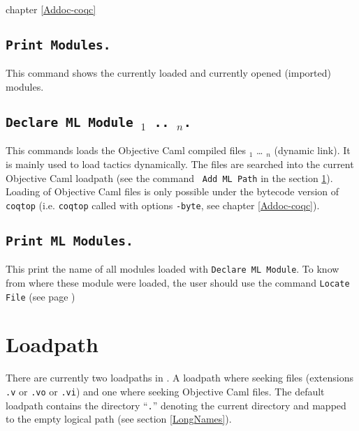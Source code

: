 \SeeAlso chapter \ref{Addoc-coqc}

\subsection{\tt Print Modules.}
This command shows the currently loaded and currently opened
(imported) modules.

\subsection{\tt Declare ML Module {\str$_1$} .. {\str$_n$}.}
This commands loads the Objective Caml compiled files {\str$_1$} \dots
{\str$_n$} (dynamic link). It is mainly used to load tactics
dynamically.
 The files are
searched into the current Objective Caml loadpath (see the command {\tt
Add ML Path} in the section \ref{loadpath}).  Loading of Objective Caml
files is only possible under the bytecode version of {\tt coqtop}
(i.e. {\tt coqtop} called with options {\tt -byte}, see chapter 
\ref{Addoc-coqc}).

\begin{ErrMsgs}
\item {}
\item {}
\end{ErrMsgs}

\subsection{\tt Print ML Modules.}
This print the name of all \ocaml{} modules loaded with \texttt{Declare
  ML Module}. To know from where these module were loaded, the user
should use the command \texttt{Locate File} (see page \pageref{Locate File})

\section{Loadpath}
\label{loadpath}

There are currently two loadpaths in \Coq. A loadpath where seeking
{\Coq} files (extensions {\tt .v} or {\tt .vo} or {\tt .vi}) and one where
seeking Objective Caml files. The default loadpath contains the
directory ``\texttt{.}'' denoting the current directory and mapped to the empty logical path (see section \ref{LongNames}).

